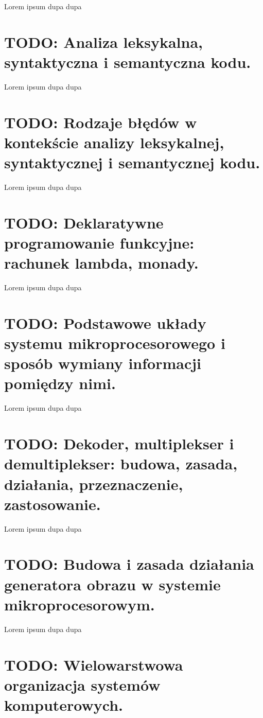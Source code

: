 \documentclass[a4paper,12pt,oneside]{book}
\begin{document}
					Lorem ipsum dupa dupa
	
	\setcounter{section}{49}
	\section{\color{red} TODO: Analiza leksykalna, syntaktyczna i semantyczna kodu. }
					
					Lorem ipsum dupa dupa
	
	\setcounter{section}{50}
	\section{\color{red} TODO: Rodzaje błędów w kontekście analizy leksykalnej, syntaktycznej i semantycznej kodu.}
					
					Lorem ipsum dupa dupa
					
	\setcounter{section}{51}
	\section{\color{red} TODO: Deklaratywne programowanie funkcyjne: rachunek lambda, monady. }
					
					Lorem ipsum dupa dupa
	
	\setcounter{section}{53}
	\section{\color{red} TODO: Podstawowe układy systemu mikroprocesorowego i sposób wymiany informacji pomiędzy nimi. }
					
					Lorem ipsum dupa dupa
	
	\setcounter{section}{54}
	\section{\color{red} TODO: Dekoder, multiplekser i demultiplekser: budowa, zasada, działania, przeznaczenie, zastosowanie. }
					
					Lorem ipsum dupa dupa
	
	\setcounter{section}{56}
	\section{\color{red} TODO: Budowa i zasada działania generatora obrazu w systemie mikroprocesorowym. }
					
					Lorem ipsum dupa dupa
	
	\setcounter{section}{56}
	\section{\color{red} TODO: Wielowarstwowa organizacja systemów komputerowych. }
						
\end{document}

